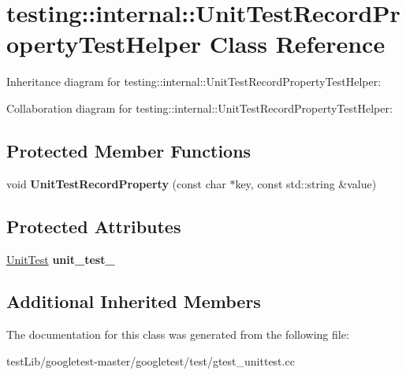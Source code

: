 \hypertarget{classtesting_1_1internal_1_1UnitTestRecordPropertyTestHelper}{}\section{testing\+:\+:internal\+:\+:Unit\+Test\+Record\+Property\+Test\+Helper Class Reference}
\label{classtesting_1_1internal_1_1UnitTestRecordPropertyTestHelper}


Inheritance diagram for testing\+:\+:internal\+:\+:Unit\+Test\+Record\+Property\+Test\+Helper\+:


Collaboration diagram for testing\+:\+:internal\+:\+:Unit\+Test\+Record\+Property\+Test\+Helper\+:
\subsection*{Protected Member Functions}
\begin{DoxyCompactItemize}
\item 
\mbox{\label{classtesting_1_1internal_1_1UnitTestRecordPropertyTestHelper_a9c5432d080faf13a1db6baff0a2944f4}} 
void {\bfseries Unit\+Test\+Record\+Property} (const char $\ast$key, const std\+::string \&value)
\end{DoxyCompactItemize}
\subsection*{Protected Attributes}
\begin{DoxyCompactItemize}
\item 
\mbox{\label{classtesting_1_1internal_1_1UnitTestRecordPropertyTestHelper_a415e13a354d3b8bd97db96aae5ef5df1}} 
\hyperlink{classtesting_1_1UnitTest}{Unit\+Test} {\bfseries unit\+\_\+test\+\_\+}
\end{DoxyCompactItemize}
\subsection*{Additional Inherited Members}


The documentation for this class was generated from the following file\+:\begin{DoxyCompactItemize}
\item 
test\+Lib/googletest-\/master/googletest/test/gtest\+\_\+unittest.\+cc\end{DoxyCompactItemize}

